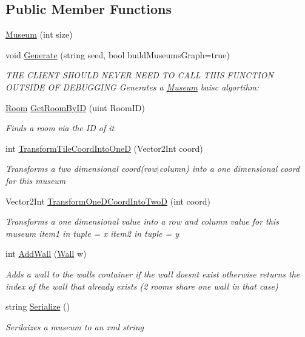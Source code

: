 \subsection*{Public Member Functions}
\begin{DoxyCompactItemize}
\item 
\mbox{\hyperlink{class_museum_aa946df02a55ba522f7a39ac688648733}{Museum}} (int size)
\item 
void \mbox{\hyperlink{class_museum_a2a301b4e27f35da164ffa03b3d3d7e81}{Generate}} (string seed, bool build\+Museums\+Graph=true)
\begin{DoxyCompactList}\small\item\em T\+HE C\+L\+I\+E\+NT S\+H\+O\+U\+LD N\+E\+V\+ER N\+E\+ED TO C\+A\+LL T\+H\+IS F\+U\+N\+C\+T\+I\+ON O\+U\+T\+S\+I\+DE OF D\+E\+B\+U\+G\+G\+I\+NG Generates a \mbox{\hyperlink{class_museum}{Museum}} baisc algortihm\+: \end{DoxyCompactList}\item 
\mbox{\hyperlink{class_room}{Room}} \mbox{\hyperlink{class_museum_a31c3e63a3a1e2edf6e219cb1f04b9515}{Get\+Room\+By\+ID}} (uint Room\+ID)
\begin{DoxyCompactList}\small\item\em Finds a room via the ID of it \end{DoxyCompactList}\item 
int \mbox{\hyperlink{class_museum_a405e60db962417dde46d46180cbf81df}{Transform\+Tile\+Coord\+Into\+OneD}} (Vector2\+Int coord)
\begin{DoxyCompactList}\small\item\em Transforms a two dimensional coord(row$\vert$column) into a one dimensional coord for this museum \end{DoxyCompactList}\item 
Vector2\+Int \mbox{\hyperlink{class_museum_a458545a518b026779c23e6c5b477bbf4}{Transform\+One\+D\+Coord\+Into\+TwoD}} (int coord)
\begin{DoxyCompactList}\small\item\em Transforms a one dimensional value into a row and column value for this museum item1 in tuple = x item2 in tuple = y \end{DoxyCompactList}\item 
int \mbox{\hyperlink{class_museum_a6e441db98efeaa314ae974222aea08e6}{Add\+Wall}} (\mbox{\hyperlink{class_wall}{Wall}} w)
\begin{DoxyCompactList}\small\item\em Adds a wall to the walls container if the wall doesn\textquotesingle{}t exist otherwise returns the index of the wall that already exists (2 rooms share one wall in that case) \end{DoxyCompactList}\item 
string \mbox{\hyperlink{class_museum_ac956bb7d7454f99944af157c79f695b8}{Serialize}} ()
\begin{DoxyCompactList}\small\item\em Serilaizes a museum to an xml string \end{DoxyCompactList}\end{DoxyCompactItemize}

